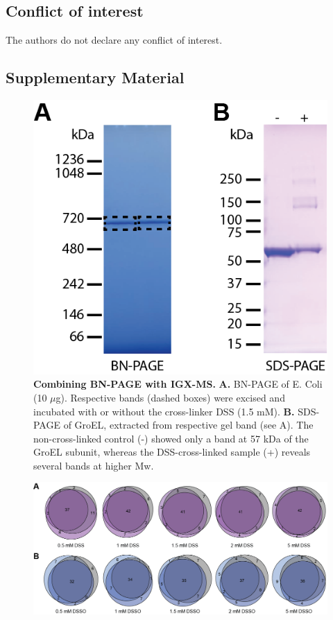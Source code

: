 \subsection*{Conflict of interest}
The authors do not declare any conflict of interest.
\clearpage
\begin{subappendices}
    \section{Supplementary Material}
    \begin{figure}[hbt]
        \center
        \includegraphics[]{Chapter.2/Figures/SI_Figure1.png}
        \caption{\textbf{Combining BN-PAGE with IGX-MS.} \textbf{A.} BN-PAGE of E. Coli (10 $\mu$g). Respective bands (dashed boxes) were excised and incubated with or without the cross-linker DSS (1.5 mM). \textbf{B.} SDS-PAGE of GroEL, extracted from respective gel band (see A). The non-cross-linked control (-) showed only a band at 57 kDa of the GroEL subunit, whereas the DSS-cross-linked sample (+) reveals several bands at higher Mw.}
        \label{fig:ch2_app_fig1}
    \end{figure}
    \vspace{1cm}
    \begin{figure}[hbt]
        \center
        \includegraphics[]{Chapter.2/Figures/SI_Figure2.png}

\end{figure}
\end{subappendices}
